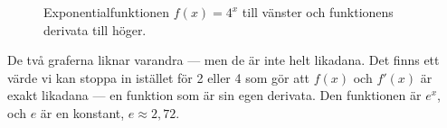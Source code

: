 \documentclass[a4paper, 12pt]{article}
\begin{document}
\begin{figure}[h!]
    \centering
    \begin{mdframed}[backgroundcolor=gray!10]
        \hskip 5pt
        \caption{Exponentialfunktionen $f(x) = 4^x$ till vänster och funktionens derivata till höger.}
        \label{fig:4^x}
    \end{mdframed}
\end{figure}

De två graferna liknar varandra --- men de är inte helt likadana. Det finns ett värde vi kan stoppa in istället för 2 eller 4 som gör att $f(x)$ och $f'(x)$ är exakt likadana --- en funktion som är sin egen derivata. Den funktionen är $e^x$, och $e$ är en konstant, $e\approx 2,72$.
\end{document}
